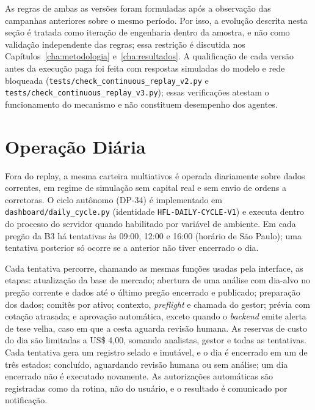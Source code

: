 As regras de ambas as versões foram formuladas após a observação das campanhas anteriores sobre o mesmo período. Por isso, a evolução descrita nesta seção é tratada como iteração de engenharia dentro da amostra, e não como validação independente das regras; essa restrição é discutida nos Capítulos~\ref{cha:metodologia} e~\ref{cha:resultados}. A qualificação de cada versão antes da execução paga foi feita com respostas simuladas do modelo e rede bloqueada (\texttt{tests/check\_continuous\_replay\_v2.py} e \texttt{tests/check\_continuous\_replay\_v3.py}); essas verificações atestam o funcionamento do mecanismo e não constituem desempenho dos agentes.

\section{Operação Diária}
\label{sec:arq-operacao-diaria}

Fora do replay, a mesma carteira multiativos é operada diariamente sobre dados correntes, em regime de simulação sem capital real e sem envio de ordens a corretoras. O ciclo autônomo (DP-34) é implementado em \texttt{dashboard/daily\_cycle.py} (identidade \texttt{HFL-DAILY-CYCLE-V1}) e executa dentro do processo do servidor quando habilitado por variável de ambiente. Em cada pregão da B3 há tentativas às 09:00, 12:00 e 16:00 (horário de São Paulo); uma tentativa posterior só ocorre se a anterior não tiver encerrado o dia.

Cada tentativa percorre, chamando as mesmas funções usadas pela interface, as etapas: atualização da base de mercado; abertura de uma análise com dia-alvo no pregão corrente e dados até o último pregão encerrado e publicado; preparação dos dados; comitês por ativo; contexto, \textit{preflight} e chamada do gestor; prévia com cotação atrasada; e aprovação automática, exceto quando o \textit{backend} emite alerta de tese velha, caso em que a cesta aguarda revisão humana. As reservas de custo do dia são limitadas a US\$ 4,00, somando analistas, gestor e todas as tentativas. Cada tentativa gera um registro selado e imutável, e o dia é encerrado em um de três estados: concluído, aguardando revisão humana ou sem análise; um dia encerrado não é executado novamente. As autorizações automáticas são registradas como da rotina, não do usuário, e o resultado é comunicado por notificação.

